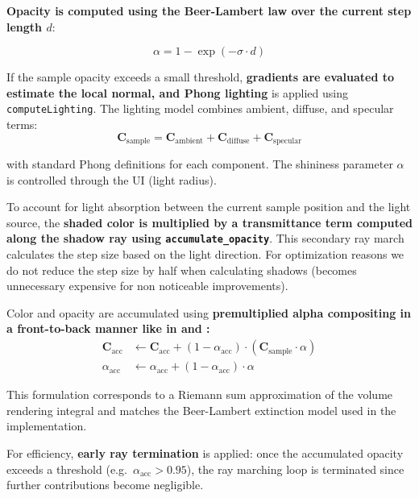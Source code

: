 \documentclass[10pt,a4paper,twoside]{tau-book}
\begin{document}
\textbf{Opacity is computed using the Beer-Lambert law over the current step length $d$}:

\begin{equation}
\alpha = 1 - \exp(-\sigma \cdot d)
\end{equation}

If the sample opacity exceeds a small threshold, \textbf{gradients are evaluated to estimate the local normal, and Phong lighting} \cite{phong1975illumination} is applied using \texttt{computeLighting}. The lighting model combines ambient, diffuse, and specular terms:
\begin{equation}
\mathbf{C}_{\text{sample}} =
\mathbf{C}_{\text{ambient}} +
\mathbf{C}_{\text{diffuse}} +
\mathbf{C}_{\text{specular}}
\end{equation}

with standard Phong definitions for each component. The shininess parameter $\alpha$ is controlled through the UI (light radius).

To account for light absorption between the current sample position and the light source, the \textbf{shaded color is multiplied by a transmittance term computed along the shadow ray using \texttt{accumulate\_opacity}}. This secondary ray march calculates the step size based on the light direction. For optimization reasons we do not reduce the step size by half when calculating shadows (becomes unnecessary expensive for non noticeable improvements).

Color and opacity are accumulated using \textbf{premultiplied alpha compositing in a front-to-back manner like in \cite{10.1145/78964.78965} and \cite{levoy1988display}:}
\begin{align}
\mathbf{C}_{\text{acc}} &\leftarrow
\mathbf{C}_{\text{acc}} + (1 - \alpha_{\text{acc}})
\cdot (\mathbf{C}_{\text{sample}} \cdot \alpha) \\
\alpha_{\text{acc}} &\leftarrow
\alpha_{\text{acc}} + (1 - \alpha_{\text{acc}}) \cdot \alpha
\end{align}

This formulation corresponds to a Riemann sum approximation of the volume rendering integral and matches the Beer-Lambert extinction model used in the implementation.

For efficiency, \textbf{early ray termination} is applied: once the accumulated opacity exceeds a threshold (e.g.\ $\alpha_{\text{acc}} > 0.95$), the ray marching loop is terminated since further contributions become negligible.

\end{document}
